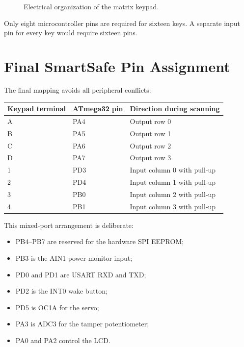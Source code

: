 \documentclass[11pt,a4paper]{article}
\begin{document}
\begin{figure}[H]
\centering
{}
\caption{Electrical organization of the matrix keypad.}
\end{figure}

Only eight microcontroller pins are required for sixteen keys. A separate input pin for every key would require sixteen pins.

\section{Final SmartSafe Pin Assignment}
The final mapping avoids all peripheral conflicts:
\begin{center}
\begin{tabular}{lll}
\toprule
Keypad terminal & ATmega32 pin & Direction during scanning \\
\midrule
A & PA4 & Output row 0 \\
B & PA5 & Output row 1 \\
C & PA6 & Output row 2 \\
D & PA7 & Output row 3 \\
1 & PD3 & Input column 0 with pull-up \\
2 & PD4 & Input column 1 with pull-up \\
3 & PB0 & Input column 2 with pull-up \\
4 & PB1 & Input column 3 with pull-up \\
\bottomrule
\end{tabular}
\end{center}

This mixed-port arrangement is deliberate:
\begin{itemize}
  \item PB4--PB7 are reserved for the hardware SPI EEPROM;
  \item PB3 is the AIN1 power-monitor input;
  \item PD0 and PD1 are USART RXD and TXD;
  \item PD2 is the INT0 wake button;
  \item PD5 is OC1A for the servo;
  \item PA3 is ADC3 for the tamper potentiometer;
  \item PA0 and PA2 control the LCD.
\end{itemize}
\end{document}
